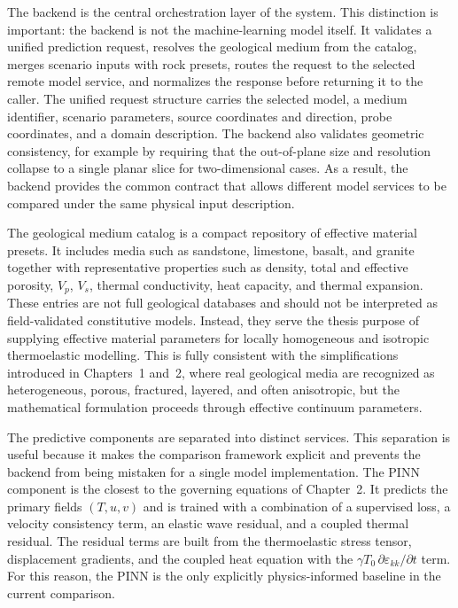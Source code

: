 The backend is the central orchestration layer of the system. This distinction is important: the backend is not the machine-learning model itself. It validates a unified prediction request, resolves the geological medium from the catalog, merges scenario inputs with rock presets, routes the request to the selected remote model service, and normalizes the response before returning it to the caller. The unified request structure carries the selected model, a medium identifier, scenario parameters, source coordinates and direction, probe coordinates, and a domain description. The backend also validates geometric consistency, for example by requiring that the out-of-plane size and resolution collapse to a single planar slice for two-dimensional cases. As a result, the backend provides the common contract that allows different model services to be compared under the same physical input description.

The geological medium catalog is a compact repository of effective material presets. It includes media such as sandstone, limestone, basalt, and granite together with representative properties such as density, total and effective porosity, \(V_p\), \(V_s\), thermal conductivity, heat capacity, and thermal expansion. These entries are not full geological databases and should not be interpreted as field-validated constitutive models. Instead, they serve the thesis purpose of supplying effective material parameters for locally homogeneous and isotropic thermoelastic modelling. This is fully consistent with the simplifications introduced in Chapters~1 and~2, where real geological media are recognized as heterogeneous, porous, fractured, layered, and often anisotropic, but the mathematical formulation proceeds through effective continuum parameters.

The predictive components are separated into distinct services. This separation is useful because it makes the comparison framework explicit and prevents the backend from being mistaken for a single model implementation. The PINN component is the closest to the governing equations of Chapter~2. It predicts the primary fields \((T, u, v)\) and is trained with a combination of a supervised loss, a velocity consistency term, an elastic wave residual, and a coupled thermal residual. The residual terms are built from the thermoelastic stress tensor, displacement gradients, and the coupled heat equation with the \(\gamma T_0 \, \partial \varepsilon_{kk}/\partial t\) term. For this reason, the PINN is the only explicitly physics-informed baseline in the current comparison.

